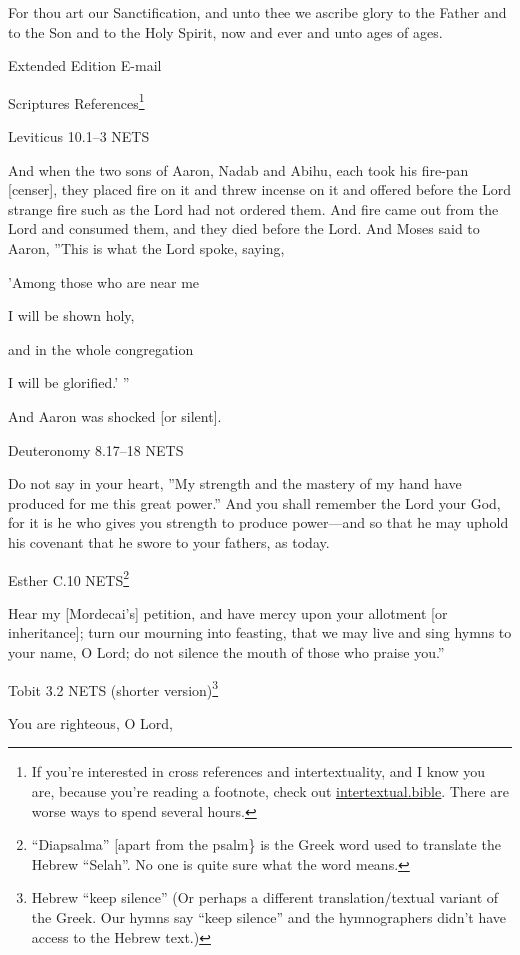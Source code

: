 \documentclass[
]{article}
\newcommand{\RL}[1]{\beginR #1\endR}
\begin{document}
For thou art our Sanctification, and unto thee we ascribe glory to the
Father and to the Son and to the Holy Spirit, now and ever and unto ages
of ages.

Extended Edition E-mail

Scriptures References\footnote{If you're interested in cross references
  and intertextuality, and I know you are, because you're reading a
  footnote, check out
  \href{http://intertextual.bible}{\ul{intertextual.bible}}. There are
  worse ways to spend several hours.}

Leviticus 10.1--3 NETS

And when the two sons of Aaron, Nadab and Abihu, each took his fire-pan
{[}censer{]}, they placed fire on it and threw incense on it and offered
before the Lord strange fire such as the Lord had not ordered them. And
fire came out from the Lord and consumed them, and they died before the
Lord. And Moses said to Aaron, \RL{''}This is what the Lord spoke,
saying,

\RL{'}Among those who are near me

I will be shown holy,

and in the whole congregation

I will be glorified.\RL{' ''}

And Aaron was shocked {[}or silent{]}.

Deuteronomy 8.17--18 NETS

Do not say in your heart, \RL{''}My strength and the mastery of my hand
have produced for me this great power.'' And you shall remember the Lord
your God, for it is he who gives you strength to produce power---and so
that he may uphold his covenant that he swore to your fathers, as today.

Esther C.10 NETS\footnote{``Diapsalma'' {[}apart from the psalm\} is the
  Greek word used to translate the Hebrew ``Selah''. No one is quite
  sure what the word means.}

Hear my {[}Mordecai's{]} petition, and have mercy upon your allotment
{[}or inheritance{]}; turn our mourning into feasting, that we may live
and sing hymns to your name, O Lord; do not silence the mouth of those
who praise you.''

Tobit 3.2 NETS (shorter version)\footnote{Hebrew ``keep silence'' (Or
  perhaps a different translation/textual variant of the Greek. Our
  hymns say ``keep silence'' and the hymnographers didn't have access to
  the Hebrew text.)}

You are righteous, O Lord,
\end{document}
